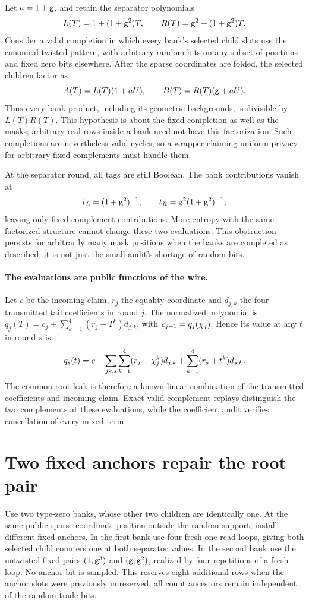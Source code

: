 \documentclass[11pt]{article}
\begin{document}
Let $a=1+\mathsf{g}$, and retain the separator polynomials
\[
 L(T)=1+(1+\mathsf{g}^2)T,
 \qquad R(T)=\mathsf{g}^2+(1+\mathsf{g}^2)T.
\]
Consider a valid completion in which every bank's selected child slots use the canonical twisted pattern, with arbitrary random bits on any subset of positions and fixed zero bits elsewhere. After the sparse coordinates are folded, the selected children factor as
\[
 A(T)=L(T)(1+aU),\qquad B(T)=R(T)(\mathsf{g}+aU).
\]
Thus every bank product, including its geometric backgrounds, is divisible by $L(T)R(T)$. This hypothesis is about the fixed completion as well as the masks; arbitrary real rows inside a bank need not have this factorization. Such completions are nevertheless valid cycles, so a wrapper claiming uniform privacy for arbitrary fixed complements must handle them.

At the separator round, all tags are still Boolean. The bank contributions vanish at
\[
 t_L=(1+\mathsf{g}^2)^{-1},\qquad t_R=\mathsf{g}^2(1+\mathsf{g}^2)^{-1},
\]
leaving only fixed-complement contributions. More entropy with the same factorized structure cannot change these two evaluations. This obstruction persists for arbitrarily many mask positions when the banks are completed as described; it is not just the small audit's shortage of random bits.

\paragraph{The evaluations are public functions of the wire.} Let $c$ be the incoming claim, $r_j$ the equality coordinate and $d_{j,k}$ the four transmitted tail coefficients in round $j$. The normalized polynomial is $q_j(T)=c_j+\sum_{k=1}^4(r_j+T^k)d_{j,k}$, with $c_{j+1}=q_j(\chi_j)$. Hence its value at any $t$ in round $s$ is
\[
 q_s(t)=c+
 \sum_{j<s}\sum_{k=1}^4(r_j+\chi_j^k)d_{j,k}
 +\sum_{k=1}^4(r_s+t^k)d_{s,k}.
\]
The common-root leak is therefore a known linear combination of the transmitted coefficients and incoming claim. Exact valid-complement replays distinguish the two complements at these evaluations, while the coefficient audit verifies cancellation of every mixed term.

\section{Two fixed anchors repair the root pair}

Use two type-zero banks, whose other two children are identically one. At the same public sparse-coordinate position outside the random support, install different fixed anchors. In the first bank use four fresh one-read loops, giving both selected child counters one at both separator values. In the second bank use the untwisted fixed pairs $(1,\mathsf{g}^3)$ and $(\mathsf{g},\mathsf{g}^2)$, realized by four repetitions of a fresh loop. No anchor bit is sampled. This reserves eight additional rows when the anchor slots were previously unreserved; all count ancestors remain independent of the random trade bits.
\end{document}
